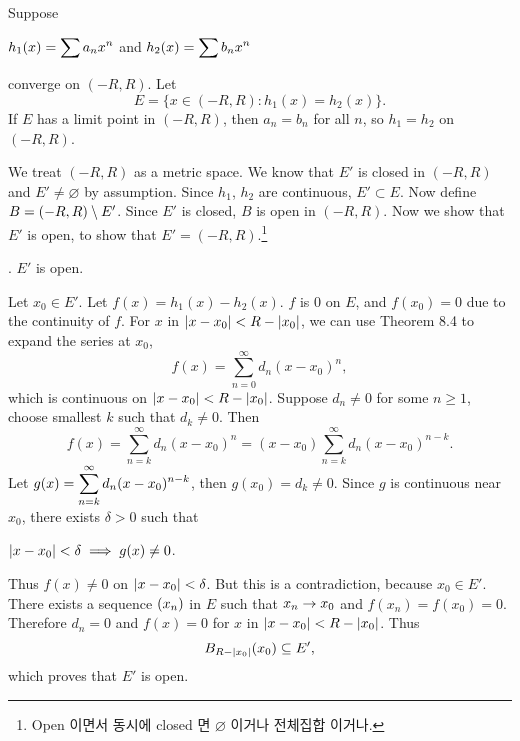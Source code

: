  Suppose
\begin{center}
    \(h_1(x) = \displaystyle \sum a_n x^n\) and \(\displaystyle h_2(x) = \sum b_n x^n\)
\end{center}
converge on \((-R, R)\). Let
\[
    E = \{x \in (-R, R) : h_1(x) = h_2(x)\}.
\]
If \(E\) has a limit point in \((-R, R)\), then \(a_n = b_n\) for all \(n\), so \(h_1 = h_2\) on \((-R, R)\).

\pf We treat \((-R, R)\) as a metric space. We know that \(E'\) is closed in \((-R, R)\) and \(E' \neq \varnothing\) by assumption. Since \(h_1\), \(h_2\) are continuous, \(E' \subset E\). Now define \(B = (-R, R) \setminus E'\). Since \(E'\) is closed, \(B\) is open in \((-R, R)\). Now we show that \(E'\) is open, to show that \(E' = (-R, R)\).\footnote{Open 이면서 동시에 closed 면 \(\varnothing\) 이거나 전체집합 이거나.}

\quad \claim. \(E'\) is open.

\quad \pf Let \(x_0 \in E'\). Let \(f(x) = h_1(x) - h_2(x)\). \(f\) is 0 on \(E\), and \(f(x_0) = 0\) due to the continuity of \(f\). For \(x\) in \(\left| x - x_0 \right| < R - \left| x_0 \right|\), we can use Theorem 8.4 to expand the series at \(x_0\),
\[
    f(x) = \sum_{n=0}^\infty d_n(x-x_0)^n,
\]
which is continuous on \(\left| x - x_0 \right| < R - \left| x_0 \right|\). Suppose \(d_n \neq 0\) for some \(n \geq 1\), choose smallest \(k\) such that \(d_k \neq 0\). Then
\[
    f(x) = \sum_{n=k}^\infty d_n(x-x_0)^n = (x-x_0) \sum_{n=k}^\infty d_n (x-x_0)^{n-k}.
\]
Let \(g(x) = \displaystyle\sum_{n=k}^\infty d_n(x-x_0)^{n-k}\), then \(g(x_0) = d_k \neq 0\). Since \(g\) is continuous near \(x_0\), there exists \(\delta > 0\) such that
\begin{center}
    \(\left| x - x_0 \right| < \delta \implies g(x) \neq 0\).
\end{center}
Thus \(f(x) \neq 0\) on \(\left| x - x_0 \right| < \delta\). But this is a contradiction, because \(x_0 \in E'\). There exists a sequence \(\left( x_n \right)\) in \(E\) such that \(x_n \rightarrow x_0\) and \(f(x_n) = f(x_0) = 0\). Therefore \(d_n = 0\) and \(f(x) = 0\) for \(x\) in \(\left| x-x_0 \right| < R - \left| x_0 \right|\). Thus
\[
    B_{R - \left| x_0 \right|}(x_0) \subseteq E',
\]
which proves that \(E'\) is open.

\pagebreak
